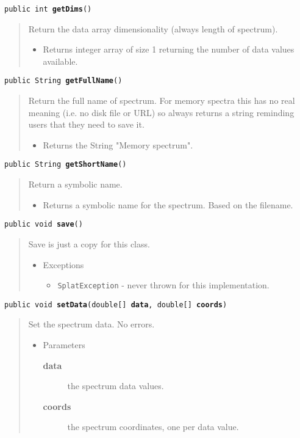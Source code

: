 \documentclass[twoside,11pt,nolof]{starlink}
\providecommand{\method}[1]{\texttt{#1}}
\newenvironment{desc}{\begin{quote}}{\end{quote}}
\begin{document}
\method{public int \textbf{getDims}()\label{l15}\label{l16}}
\begin{desc}Return the data array dimensionality (always length of
 spectrum).
\begin{itemize}
\item{Returns integer array of size 1 returning the number of data
                 values available. }
\end{itemize}
\end{desc}

\method{public String \textbf{getFullName}()\label{l17}\label{l18}}
\begin{desc}Return the full name of spectrum. For memory spectra this has
 no real meaning (i.e. no disk file or URL) so always returns a
 string reminding users that they need to save it.
\begin{itemize}
\item{Returns the String "Memory spectrum". }
\end{itemize}
\end{desc}

\method{public String \textbf{getShortName}()\label{l19}\label{l20}}
\begin{desc}Return a symbolic name.
\begin{itemize}
\item{Returns a symbolic name for the spectrum. Based on the filename. }
\end{itemize}
\end{desc}

\method{public void \textbf{save}()\label{l21}\label{l22}}
\begin{desc}Save is just a copy for this class.
\begin{itemize}
\item{{Exceptions}
  \begin{itemize}
   \item{\vspace{-.6ex}\texttt{SplatException} - never thrown for this implementation.}
  \end{itemize}
}
\end{itemize}
\end{desc}

\method{public void \textbf{setData}(\texttt{double[]} \textbf{data}, \texttt{double[]} \textbf{coords})\label{l23}\label{l24}}
\begin{desc}Set the spectrum data. No errors.
\begin{itemize}
\item{Parameters
  \begin{description}
   \item[\textbf{data}]{the spectrum data values.}
   \item[\textbf{coords}]{the spectrum coordinates, one per data value.}
  \end{description}}
\end{itemize}
\end{desc}
\end{document}
